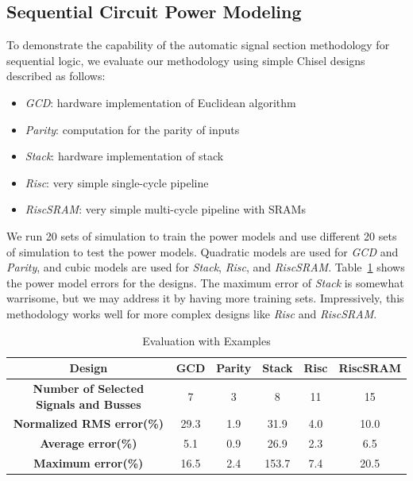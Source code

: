 \subsection{Sequential Circuit Power Modeling}

To demonstrate the capability of the automatic signal section methodology for sequential logic,
we evaluate our methodology using simple Chisel designs described as follows:

\begin{itemize}
	\item \textit{GCD}: hardware implementation of Euclidean algorithm
	\item \textit{Parity}: computation for the parity of inputs
	\item \textit{Stack}: hardware implementation of stack
	\item \textit{Risc}: very simple single-cycle pipeline
	\item \textit{RiscSRAM}: very simple multi-cycle pipeline with SRAMs
\end{itemize}

We run 20 sets of simulation to train the power models and use different 20 sets of simulation
to test the power models. Quadratic models are used for \emph{GCD} and \emph{Parity}, and 
cubic models are used for \emph{Stack}, \emph{Risc}, and \emph{RiscSRAM}. 
Table~\ref{tbl:results} shows the power model errors for the designs. The maximum error of
\emph{Stack} is somewhat warrisome, but we may address it by having more training sets.
Impressively, this methodology works well for more complex designs like \emph{Risc} and \emph{RiscSRAM}.

\begin{table}
\begin{center}
  \begin{tabular}{ | c | c | c | c | c | c |}
    \hline
    \textbf{Design} & \textbf{GCD} & \textbf{Parity} & \textbf{Stack} & \textbf{Risc} & \textbf{RiscSRAM} \\ \hline
	\textbf{Number of Selected Signals and Busses} & 7 & 3 & 8 & 11 & 15 \\ \hline
	\textbf{Normalized RMS error(\%)} &  29.3 & 1.9 & 31.9 & 4.0 & 10.0 \\ \hline
	\textbf{Average error(\%)}        &   5.1 & 0.9 & 26.9 & 2.3 & 6.5 \\ \hline
	\textbf{Maximum error(\%)}        &  16.5 & 2.4 & 153.7 & 7.4 & 20.5 \\ \hline

  \end{tabular}
  \caption{Evaluation with Examples}
  \label{tbl:results}
\end{center}
\end{table}

